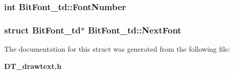 \subsubsection{\setlength{\rightskip}{0pt plus 5cm}int Bit\-Font\_\-td::Font\-Number}\label{structBitFont__td_m3}


\subsubsection{\setlength{\rightskip}{0pt plus 5cm}struct Bit\-Font\_\-td$\ast$ Bit\-Font\_\-td::Next\-Font}\label{structBitFont__td_m4}




The documentation for this struct was generated from the following file:\begin{CompactItemize}
\item 
{\bf DT\_\-drawtext.h}\end{CompactItemize}
